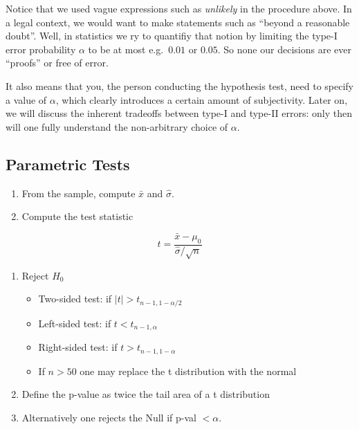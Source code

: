 \documentclass[
  letterpaper,
  DIV=11,
  numbers=noendperiod]{scrreprt}
\providecommand{\tightlist}{%
  \setlength{\itemsep}{0pt}\setlength{\parskip}{0pt}}\usepackage{longtable,booktabs,array}
\begin{document}
Notice that we used vague expressions such as \emph{unlikely} in the
procedure above. In a legal context, we would want to make statements
such as ``beyond a reasonable doubt''. Well, in statistics we ry to
quantifiy that notion by limiting the type-I error probability
\(\alpha\) to be at most e.g.~\(0.01\) or \(0.05\). So none our
decisions are ever ``proofs'' or free of error.

It also means that you, the person conducting the hypothesis test, need
to specify a value of \(\alpha\), which clearly introduces a certain
amount of subjectivity. Later on, we will discuss the inherent tradeoffs
between type-I and type-II errors: only then will one fully understand
the non-arbitrary choice of \(\alpha\).

\hypertarget{parametric-tests}{%
\subsection{Parametric Tests}\label{parametric-tests}}

\begin{enumerate}
\def\labelenumi{\arabic{enumi}.}
\tightlist
\item
  From the sample, compute \(\bar{x}\) and \(\hat{\sigma}\).
\item
  Compute the test statistic
\end{enumerate}

\[t = \frac{\bar{x} - \mu_0}{\hat{\sigma}/\sqrt{n}}\]

\begin{enumerate}
\def\labelenumi{\arabic{enumi}.}
\setcounter{enumi}{2}
\tightlist
\item
  Reject \(H_0\)

  \begin{itemize}
  \tightlist
  \item
    Two-sided test: if \(|t| > t_{n-1, 1-\alpha/2}\)
  \item
    Left-sided test: if \(t < t_{n-1, \alpha}\)
  \item
    Right-sided test: if \(t > t_{n-1, 1-\alpha}\)
  \item
    If \(n>50\) one may replace the t distribution with the normal
  \end{itemize}
\item
  Define the p-value as twice the tail area of a t distribution
\item
  Alternatively one rejects the Null if p-val \(< \alpha\).
\end{enumerate}
\end{document}
